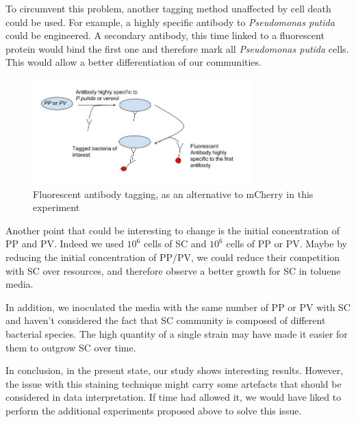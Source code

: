 \documentclass[a4paper, 10pt, conference]{ieeeconf}   %
\begin{document}
To circumvent this problem, another tagging method unaffected by cell death could be used. For example, a highly specific antibody to \textit{Pseudomonas putida} could be engineered. A secondary antibody, this time linked to a fluorescent protein would bind the first one and therefore mark all \textit{Pseudomonas putida} cells. This would allow a better differentiation of our communities.
\begin{figure}[H]
	\centering
	
	\includegraphics[width=8.5cm]{antibodytag.jpg}
	\caption{Fluorescent antibody tagging, as an alternative to mCherry in this experiment}
	\label{antibody}
	
\end{figure}
Another point that could be interesting to change is the initial concentration of PP and PV. Indeed we used $10^{6}$ cells of SC and $10^{6}$ cells of PP or PV. Maybe by reducing the initial concentration of PP/PV, we could reduce their competition with SC over resources, and therefore observe a better growth for SC in toluene media. 

In addition, we inoculated the media with the same number of PP or PV with SC and haven't considered the fact that SC community is composed of different bacterial species.
The high quantity of a single strain may have made it easier for them  to outgrow SC over time. 

%

In conclusion, in the present state, our study shows interesting results. However, the issue with this staining technique might carry some artefacts that should be considered in data interpretation. If time had allowed it, we would have liked to perform the additional experiments proposed above to solve this issue.
 
\end{document}
